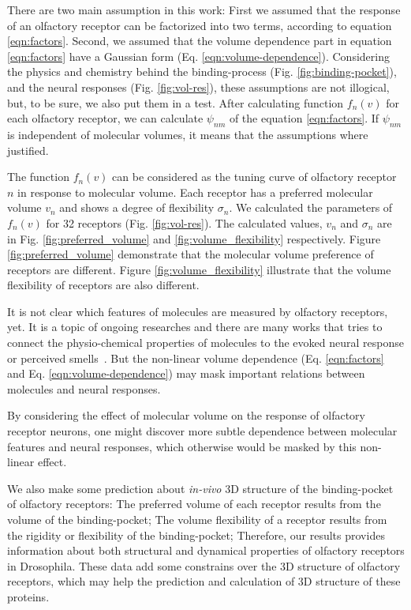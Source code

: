 \documentclass[11pt]{paper} %
\newcommand{\numberofreceptors}{32 }
\begin{document}
There are two main assumption in this work: 
First we assumed that the response of an olfactory receptor can be factorized into two terms, 
according to equation \ref{eqn:factors}.
Second, we assumed that the volume dependence part in equation \ref{eqn:factors} 
have a Gaussian form (Eq. \ref{eqn:volume-dependence}).
Considering the physics and chemistry behind the binding-process (Fig. \ref{fig:binding-pocket}), 
and the neural responses (Fig. \ref{fig:vol-res}), these assumptions are not illogical, 
but, to be sure, we also put them in a test. 
After calculating function $f_n(v)$ for each olfactory receptor, we can calculate $\psi_{nm}$ of the equation \ref{eqn:factors}.
If $\psi_{nm}$ is independent of molecular volumes, it means that the assumptions where justified.

The function $f_n(v)$ can be considered as the tuning curve of olfactory receptor $n$ in response to molecular volume. 
Each receptor has a preferred molecular volume $v_n$ and shows a degree of flexibility $\sigma_n$. 
We calculated the parameters of $f_n(v)$ for \numberofreceptors receptors (Fig. \ref{fig:vol-res}). 
The calculated values, $v_n$ and $\sigma_n$ are in Fig. \ref{fig:preferred_volume} and \ref{fig:volume_flexibility} respectively.
Figure \ref{fig:preferred_volume} demonstrate that the molecular volume preference of receptors are different. 
Figure \ref{fig:volume_flexibility} illustrate that the volume flexibility of receptors are also different.

It is not clear which features of molecules are measured by olfactory receptors, yet. 
It is a topic of ongoing researches  
and there are many works that tries to connect the physio-chemical properties of molecules to the evoked neural response or perceived smells~\cite{Gabler2013,Schmuker2007}.
But the non-linear volume dependence (Eq. \ref{eqn:factors} and Eq. \ref{eqn:volume-dependence})  
may mask important relations between molecules and neural responses.

By considering the effect of molecular volume on the response of olfactory receptor neurons, 
one might discover more subtle dependence between molecular features and neural responses, 
which otherwise would be masked by this non-linear effect.

We also make some prediction about {\it in-vivo} 3D structure of the binding-pocket of olfactory receptors:
The preferred volume of each receptor results from the volume of the binding-pocket; 
The volume flexibility of a receptor results from the rigidity or flexibility of the binding-pocket; 
Therefore, our results provides information about both structural and dynamical properties of olfactory receptors in Drosophila. 
These data add some constrains over the 3D structure of olfactory receptors, 
which may help the prediction and calculation of 3D structure of these proteins. 
\end{document}
